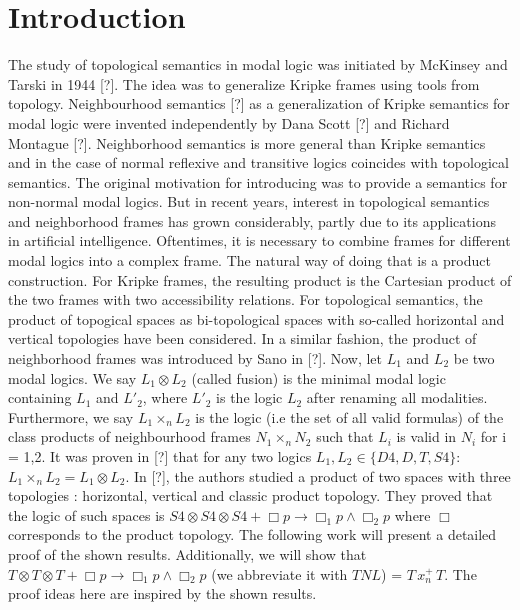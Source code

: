 \documentclass[12pt, a4paper]{scrartcl}
\begin{document}
\section{Introduction}
The study of topological semantics in modal logic was initiated by McKinsey and Tarski in 1944 [?]. The idea was to generalize Kripke frames using tools from topology.
 Neighbourhood semantics [?] as a generalization of Kripke semantics for modal logic were invented independently by Dana Scott [?] and Richard Montague [?].
Neighborhood semantics is more general than Kripke semantics and in the case of normal reflexive and transitive logics coincides with topological semantics.
The original motivation for introducing was to provide a semantics for non-normal modal logics. But in
recent years, interest in topological semantics and neighborhood frames has grown considerably, partly due to its applications in artificial intelligence. \newline
Oftentimes, it is necessary to combine frames for different modal logics into a complex
frame. The natural way of doing that is a product construction. For Kripke frames,
the resulting product is the Cartesian product of the two frames with two accessibility
relations. For topological semantics, the product of topogical spaces as bi-topological
spaces with so-called horizontal and vertical topologies have been considered. In a similar
fashion, the product of neighborhood frames was introduced by Sano in [?]. \newline
Now, let $L_1$ and $L_2$ be two modal logics. We say $L_1\otimes L_2$ (called fusion) is the 
minimal modal logic containing $L_1$ and $L'_2$, where $L'_2$ is the logic $L_2$ after renaming all modalities.
Furthermore, we say $L_1 \times_n L_2$ is the logic (i.e the set of all valid formulas) of the class 
products of neighbourhood frames $N_1 \times_n N_2$ such that $L_i$ is valid in $N_i$ for i = 1,2.
It was proven in [?] that for any two logics $L_1, L_2 \in \{D4,D,T,S4\}: $  $L_1\times_n L_2 = L_1 \otimes L_2$.
In [?], the authors studied a product of two spaces with three topologies : horizontal, vertical and
classic product topology. They proved that the logic of such spaces is $S4 \otimes S4 \otimes S4 + \Box p \rightarrow \Box_1 p \land \Box_2 p$
where $\Box$ corresponds to the product topology. \newline
The following work will present a detailed proof of the shown results. Additionally, we will show that $T\otimes T\otimes T + \Box p \rightarrow \Box_1 p \land \Box_2p$ 
 (we abbreviate it with $TNL$) = $T \,x^+_n \, T$. The proof ideas here are inspired by the shown results.
 \clearpage
\end{document}
